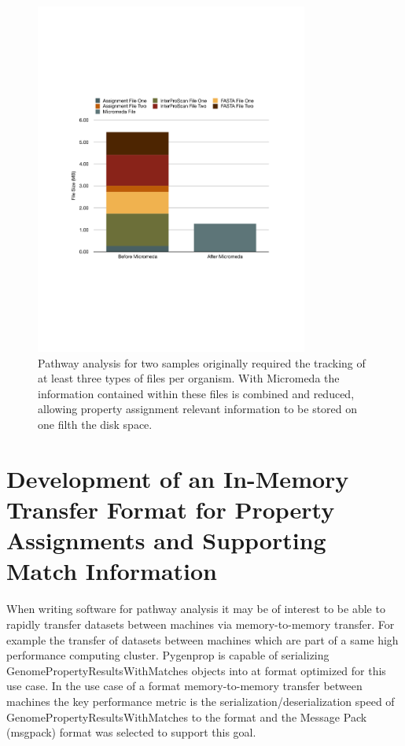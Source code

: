 \begin{figure}[!ht]
  \centering
	\includegraphics[width=0.80\textwidth]{media/micromeda_file_size.pdf}
	 \caption{Pathway analysis for two samples originally required the tracking of at least three types of files per organism. With Micromeda the information contained within these files is combined and reduced, allowing property assignment relevant information to be stored on one filth the disk space.}
	 \label{fig:micromedafilesize}
\end{figure}

\section{Development of an In-Memory Transfer Format for Property Assignments and Supporting Match Information}

When writing software for pathway analysis it may be of interest to be able to rapidly transfer datasets between machines via memory-to-memory transfer. For example the transfer of datasets between machines which are part of a same high performance computing cluster. Pygenprop is capable of serializing GenomePropertyResultsWithMatches objects into at format optimized for this use case. In the use case of a format memory-to-memory transfer between machines the key performance metric is the serialization/deserialization speed of GenomePropertyResultsWithMatches to the format and the Message Pack (msgpack) format was selected to support this goal.

